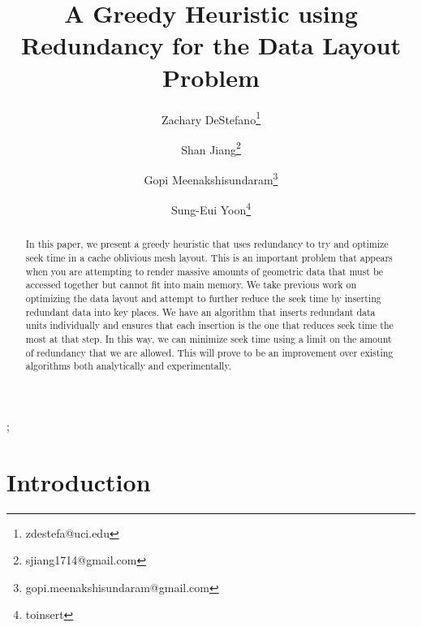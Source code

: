 \documentclass[conference]{acmsiggraph}
\title{A Greedy Heuristic using Redundancy for the Data Layout Problem}
\author[1]{Zachary DeStefano\thanks{zdestefa@uci.edu}}
\author[1]{Shan Jiang\thanks{sjiang1714@gmail.com}}
\author[1]{Gopi Meenakshisundaram\thanks{gopi.meenakshisundaram@gmail.com}}
\author[2]{Sung-Eui Yoon\thanks{toinsert}}
\affil[1]{University of California, Irvine}
\affil[2]{KAIST}
\begin{document}

\maketitle

\begin{abstract}

In this paper, we present a greedy heuristic that uses redundancy to try and optimize seek time in a cache oblivious mesh layout. This is an important problem that appears when you are attempting to render massive amounts of geometric data that must be accessed together but cannot fit into main memory. We take previous work on optimizing the data layout and attempt to further reduce the seek time by inserting redundant data into key places. We have an algorithm that inserts redundant data units individually and ensures that each insertion is the one that reduces seek time the most at that step. In this way, we can minimize seek time using a limit on the amount of redundancy that we are allowed. This will prove to be an improvement over existing algorithms both analytically and experimentally. 

\end{abstract}

\begin{CRcatlist}
  ;
\end{CRcatlist}

\keywordlist


\TOGlinkslist


\copyrightspace

\section{Introduction}
\end{document}
